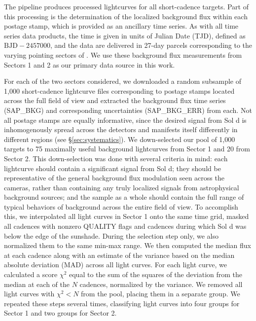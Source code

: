 \documentclass[modern]{aastex62}
\begin{document}
The \TESS pipeline produces processed lightcurves for all short-cadence targets. 
Part of this processing is the determination of the localized background flux 
within each postage stamp, which is provided as an ancillary time series. 
As with all \TESS time series data products, the time is given in units of \TESS Julian 
Date (TJD), defined as $\mathrm{BJD} - 2457000$, and the data are delivered in 27-day 
parcels corresponding to the varying pointing sectors of \TESS. 
We use these background flux measurements from Sectors 1 and 2 as our primary 
data source in this work. 

For each of the two sectors considered, we downloaded a random subsample of 
1,000 short-cadence lightcurve files corresponding to postage stamps located 
across the full \TESS field of view and extracted the background flux time 
series (\textsf{SAP\_BKG}) and corresponding uncertainties
(\textsf{SAP\_BKG\_ERR}) from each. 
Not all postage stamps are equally informative, since the desired signal from 
Sol d is inhomogenously spread across the \TESS detectors and manifests itself
differently in different regions (see \S\ref{sec:systematics}). 
We down-selected our pool of 1,000 targets to 75 maximally useful background 
lightcurves from Sector 1 and 20 from Sector 2. 
This down-selection was done with several criteria in mind: each lightcurve 
should contain a significant signal from Sol d; they should be representative 
of the general background flux modulation seen across the \TESS cameras, rather 
than containing any truly localized signals from astrophysical background 
sources; and the sample as a whole should contain the full range of typical 
behaviors of background across the entire \TESS field of view. 
To accomplish this, we interpolated all light curves in Sector 1 onto the same time
grid, masked all cadences with nonzero \textsf{QUALITY} flags and
cadences during which Sol d was below the edge of the sunshade.
During the selection step only, we also normalized them to the same min-max range.
We then computed the median
flux at each cadence along with an estimate of the variance based on the
median absolute deviation (MAD) across all light curves.
For each light curve, we calculated a score $\chi^2$ equal to the sum of the squares of the
deviation from the median at each of the $N$ cadences, normalized by the variance.
We removed all light curves with $\chi^2 < N$ from the pool, placing
them in a separate group. We repeated these steps several times,
classifying light curves into four groups for Sector 1 and two groups for Sector 2. 
\end{document}
